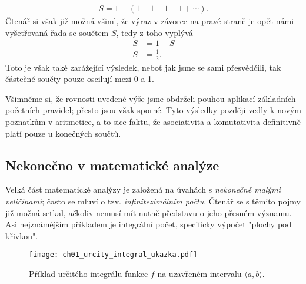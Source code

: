 \begin{align*}
S=1-(1-1+1-1+\cdots ) .
\end{align*}
Čtenář si však již možná všiml, že výraz v závorce na pravé straně je opět námi vyšetřovaná řada se součtem $S$, tedy z toho vyplývá
\begin{align*}
S&=1-S\\
S&=\frac{1}{2} .
\end{align*}
Toto je však také zarážející výsledek, neboť jak jsme se sami přesvědčili, tak částečné součty pouze oscilují mezi 0 a 1.\par
Všimněme si, že rovnosti uvedené výše jsme obdrželi pouhou aplikací základních početních pravidel; přesto jsou však sporné. Tyto výsledky později vedly k novým poznatkům v aritmetice, a to sice faktu, že asociativita a komutativita definitivně platí pouze u konečných součtů.

\subsection{Nekonečno v matematické analýze}

Velká část matematické analýzy je založená na úvahách s \emph{nekonečně malými veličinami}; často se mluví o tzv. \emph{infinitezimálním počtu}. Čtenář se s těmito pojmy již možná setkal, ačkoliv nemusí mít nutně představu o jeho přesném významu. Asi nejznámějším příkladem je integrální počet, specificky výpočet "plochy pod křivkou".
\begin{figure}[H]
	\centering
	\texttt{[image: ch01\_urcity\_integral\_ukazka.pdf]}
	\caption{Příklad určitého integrálu funkce $f$ na uzavřeném intervalu $\langle a,b \rangle$.}
	\label{fig:urcity_integral_ukazka}
\end{figure}


